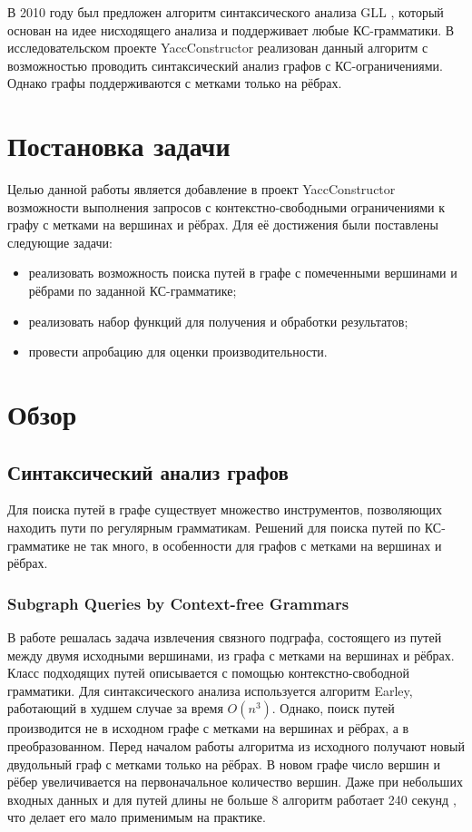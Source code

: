 \documentclass[14pt]{matmex-diploma}
\begin{document}
  В 2010 году был предложен алгоритм синтаксического анализа GLL \cite{gll}, который основан на идее нисходящего анализа и  поддерживает любые КС-грамматики. В исследовательском проекте YaccConstructor \cite{YaccConstructorPage} реализован данный алгоритм с возможностью проводить синтаксический анализ графов с КС-ограничениями. Однако графы поддерживаются с метками только на рёбрах.

\section{Постановка задачи}

Целью данной работы является добавление в проект YaccConstructor возможности выполнения запросов с контекстно-свободными ограничениями к графу с метками на вершинах и рёбрах. Для её достижения были поставлены следующие задачи:

\begin{itemize}
    \item реализовать возможность поиска путей в графе с помеченными вершинами и рёбрами по заданной КС-грамматике;
    \item реализовать набор функций для получения и обработки результатов;
    \item провести апробацию для оценки производительности.
    
\end{itemize}

\section{Обзор}

\subsection{Синтаксический анализ графов}

Для поиска путей в графе существует множество инструментов, позволяющих находить пути по регулярным грамматикам. Решений для поиска путей по КС-грамматике не так много, в особенности для графов с метками на вершинах и рёбрах.

\subsubsection{Subgraph Queries by Context-free Grammars}
В работе \cite{subgraph} решалась задача извлечения связного подграфа, состоящего из путей между двумя исходными вершинами, из графа с метками на вершинах и рёбрах. Класс подходящих путей описывается с помощью контекстно-свободной грамматики. Для синтаксического анализа используется алгоритм Earley, работающий в худшем случае за время $O(n^3)$. Однако, поиск путей производится не в исходном графе с метками на вершинах и рёбрах, а в преобразованном. Перед началом работы алгоритма из исходного получают новый двудольный граф с метками только на рёбрах. В новом графе число вершин и рёбер увеличивается на первоначальное количество вершин. Даже при небольших входных данных и для путей длины не больше 8 алгоритм работает 240 секунд \cite{subgraph}, что делает его мало применимым на практике.
\end{document}
